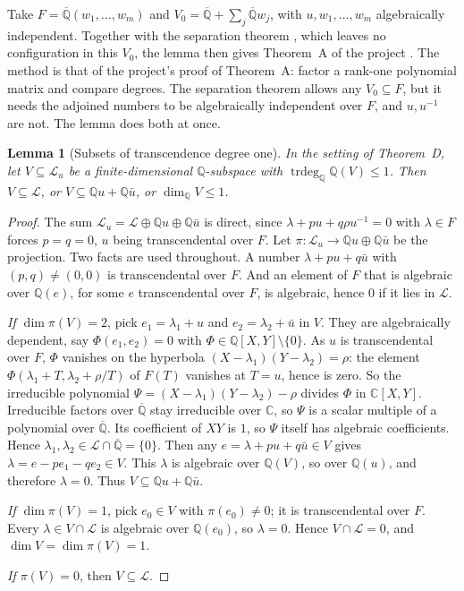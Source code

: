 \documentclass[11pt,a4paper]{article}
\theoremstyle{plain}
\newtheorem{lemma}[theorem]{Lemma}
\theoremstyle{definition}
\newcommand{\C}{\mathbb{C}}
\newcommand{\Q}{\mathbb{Q}}
\newcommand{\Qbar}{\overline{\mathbb{Q}}}
\newcommand{\cL}{\mathcal{L}}
\newcommand{\trdeg}{\operatorname{trdeg}}
\begin{document}
Take $F=\Qbar(w_{1},\dots,w_{m})$ and $V_{0}=\Qbar+\sum_{j}\Qbar w_{j}$, with
$u,w_{1},\dots,w_{m}$ algebraically independent. Together with the separation theorem
\cite[Thm.~10.16]{BP}, which leaves no configuration in this $V_{0}$, the lemma then
gives Theorem~A of the project \cite[Thm.~10.1]{BP}. The method is that of the project's
proof of Theorem~A: factor a rank-one polynomial matrix and compare degrees. The
separation theorem allows any $V_{0}\subseteq F$, but it needs the adjoined numbers to be
algebraically independent over $F$, and $u,u^{-1}$ are not. The lemma does both at once.

\begin{lemma}[Subsets of transcendence degree one]\label{lem:trdeg}
In the setting of Theorem~D, let $V\subseteq\cL_{u}$ be a finite-dimensional $\Q$-subspace
with $\trdeg_{\Q}\Q(V)\le1$. Then $V\subseteq\cL$, or $V\subseteq\Q u+\Q\bar u$, or
$\dim_{\Q}V\le1$.
\end{lemma}

\begin{proof}
The sum $\cL_{u}=\cL\oplus\Q u\oplus\Q\bar u$ is direct, since $\lambda+pu+q\rho u^{-1}=0$ with
$\lambda\in F$ forces $p=q=0$, $u$ being transcendental over $F$. Let
$\pi\colon\cL_{u}\to\Q u\oplus\Q\bar u$ be the projection. Two facts are used throughout. A number
$\lambda+pu+q\bar u$ with $(p,q)\neq(0,0)$ is transcendental over $F$. And an element of
$F$ that is algebraic over $\Q(e)$, for some $e$ transcendental over $F$, is algebraic,
hence $0$ if it lies in $\cL$.

\emph{If $\dim\pi(V)=2$}, pick $e_{1}=\lambda_{1}+u$ and $e_{2}=\lambda_{2}+\bar u$ in $V$.
They are algebraically dependent, say $\Phi(e_{1},e_{2})=0$ with
$\Phi\in\Q[X,Y]\setminus\{0\}$. As $u$ is transcendental over $F$, $\Phi$ vanishes on the
hyperbola $(X-\lambda_{1})(Y-\lambda_{2})=\rho$: the element
$\Phi(\lambda_{1}+T,\lambda_{2}+\rho/T)$ of $F(T)$ vanishes at $T=u$, hence is zero. So the
irreducible polynomial $\Psi=(X-\lambda_{1})(Y-\lambda_{2})-\rho$ divides $\Phi$ in
$\C[X,Y]$. Irreducible factors over $\Qbar$ stay irreducible over $\C$, so $\Psi$ is a scalar
multiple of a polynomial over $\Qbar$. Its coefficient of $XY$ is $1$, so $\Psi$ itself has
algebraic coefficients. Hence
$\lambda_{1},\lambda_{2}\in\cL\cap\Qbar=\{0\}$. Then any $e=\lambda+pu+q\bar u\in V$ gives
$\lambda=e-pe_{1}-qe_{2}\in V$. This $\lambda$ is algebraic over $\Q(V)$, so over $\Q(u)$,
and therefore $\lambda=0$. Thus $V\subseteq\Q u+\Q\bar u$.

\emph{If $\dim\pi(V)=1$}, pick $e_{0}\in V$ with $\pi(e_{0})\neq0$; it is transcendental
over $F$. Every $\lambda\in V\cap\cL$ is algebraic over $\Q(e_{0})$, so $\lambda=0$. Hence
$V\cap\cL=0$, and $\dim V=\dim\pi(V)=1$.

\emph{If $\pi(V)=0$}, then $V\subseteq\cL$.
\end{proof}
\end{document}

